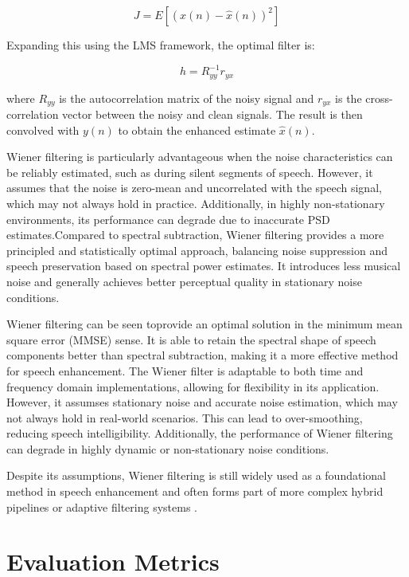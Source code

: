 \begin{equation}
    J = E\left[ (x(n) - \hat{x}(n))^2 \right]
\end{equation}

Expanding this using the LMS framework, the optimal filter is:

\begin{equation}
    h = R_{yy}^{-1} r_{yx}
\end{equation}

where \( R_{yy} \) is the autocorrelation matrix of the noisy signal and \( r_{yx} \) is the cross-correlation vector between the noisy and clean signals. The result is then convolved with \( y(n) \) to obtain the enhanced estimate \( \hat{x}(n) \).

Wiener filtering is particularly advantageous when the noise characteristics can be reliably estimated, such as during silent segments of speech. However, it assumes that the noise is zero-mean and uncorrelated with the speech signal, which may not always hold in practice. Additionally, in highly non-stationary environments, its performance can degrade due to inaccurate PSD estimates.Compared to spectral subtraction, Wiener filtering provides a more principled and statistically optimal approach, balancing noise suppression and speech preservation based on spectral power estimates. It introduces less musical noise and generally achieves better perceptual quality in stationary noise conditions.

Wiener filtering can be seen toprovide an optimal solution in the minimum mean square error (MMSE) sense. It is able to retain the spectral shape of speech components better than spectral subtraction, making it a more effective method for speech enhancement. The Wiener filter is adaptable to both time and frequency domain implementations, allowing for flexibility in its application. However, it assumses stationary noise and accurate noise estimation, which may not always hold in real-world scenarios. This can lead to over-smoothing, reducing speech intelligibility. Additionally, the performance of Wiener filtering can degrade in highly dynamic or non-stationary noise conditions.

Despite its assumptions, Wiener filtering is still widely used as a foundational method in speech enhancement and often forms part of more complex hybrid pipelines or adaptive filtering systems \cite{dubey2016evaluation, loizou2013speech}.


\section{Evaluation Metrics}
\label{sec:evaluation_metrics}

